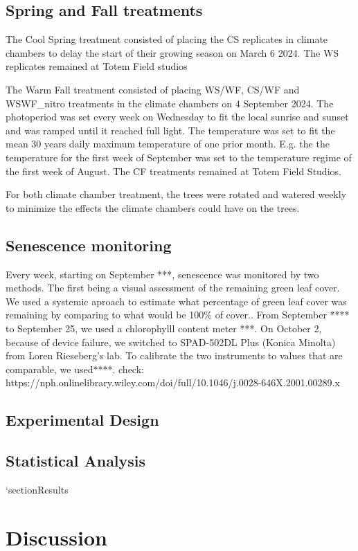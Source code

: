 \documentclass{article}
\begin{document}
\subsection{Spring and Fall treatments}
The Cool Spring treatment consisted of placing the CS replicates in climate chambers to delay the start of their growing season on March 6 2024. The WS replicates remained at Totem Field studios
\par The Warm Fall treatment consisted of placing WS/WF, CS/WF and WSWF\_nitro treatments in the climate chambers on 4 September 2024. The photoperiod was set every week on Wednesday to fit the local sunrise and sunset and was ramped until it reached full light. The temperature was set to fit the mean 30 years daily maximum temperature of one prior month. E.g. the the temperature for the first week of September was set to the temperature regime of the first week of August. The CF treatments remained at Totem Field Studios. 
\par For both climate chamber treatment, the trees were rotated and watered weekly to minimize the effects the climate chambers could have on the trees.

\subsection  {Senescence monitoring}
Every week, starting on September ***, senescence was monitored by two methods. The first being a visual assessment of the remaining green leaf cover. We used a systemic aproach to estimate what percentage of green leaf cover was remaining by comparing to what would be 100\% of cover..
From September **** to September 25, we used a chlorophylll content meter ***. On October 2, because of device failure, we switched to SPAD-502DL Plus (Konica Minolta) from Loren Rieseberg's lab. To calibrate the two instruments to values that are comparable, we used****. check: https://nph.onlinelibrary.wiley.com/doi/full/10.1046/j.0028-646X.2001.00289.x

\subsection{Experimental Design}

\subsection{Statistical Analysis}
`section{Results}
\section{Discussion}

\printbibliography
\end{document}
